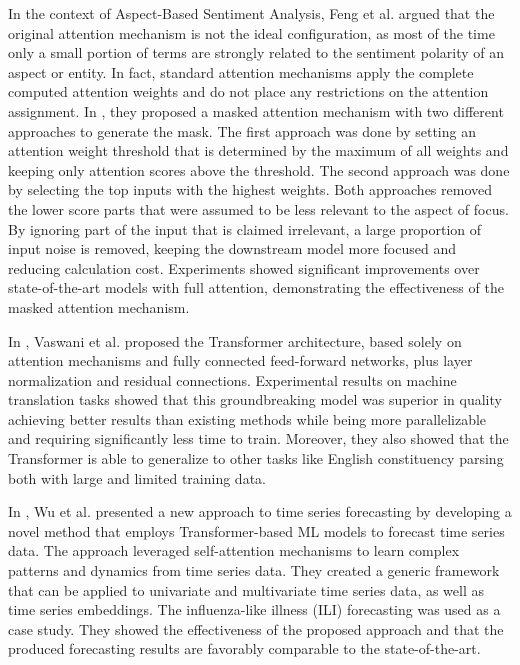 In the context of Aspect-Based Sentiment Analysis, Feng et al. argued that the original attention mechanism is not the ideal configuration, as most of the time only a small portion of terms are strongly related to the sentiment polarity of an aspect or entity.
In fact, standard attention mechanisms apply the complete computed attention weights and do not place any restrictions on the attention assignment.
In \cite{9676694}, they proposed a masked attention mechanism with two different approaches to generate the mask.
The first approach was done by setting an attention weight threshold that is determined by the maximum of all weights and keeping only attention scores above the threshold.
The second approach was done by selecting the top inputs with the highest weights.
Both approaches removed the lower score parts that were assumed to be less relevant to the aspect of focus.
By ignoring part of the input that is claimed irrelevant, a large proportion of input noise is removed, keeping the downstream model more focused and reducing calculation cost.
Experiments showed significant improvements over state-of-the-art models with full attention, demonstrating the effectiveness of the masked attention mechanism.

In \cite{Vaswani2017}, Vaswani et al. proposed the Transformer architecture, based solely on attention mechanisms and fully connected feed-forward networks, plus layer normalization and residual connections.
Experimental results on machine translation tasks showed that this groundbreaking model was superior in quality achieving better results than existing methods while being more parallelizable and requiring significantly less time to train.
Moreover, they also showed that the Transformer is able to generalize to other tasks like English constituency parsing both with large and limited training data.

In \cite{Wu2020}, Wu et al. presented a new approach to time series forecasting by developing a novel method that employs Transformer-based ML models to forecast time series data.
The approach leveraged self-attention mechanisms to learn complex patterns and dynamics from time series data.
They created a generic framework that can be applied to univariate and multivariate time series data, as well as time series embeddings.
The influenza-like illness (ILI) forecasting was used as a case study.
They showed the effectiveness of the proposed approach and that the produced forecasting results are favorably comparable to the state-of-the-art.

